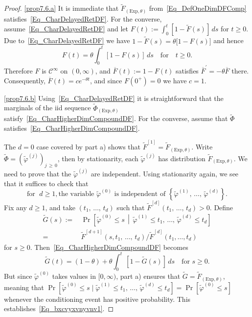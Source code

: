 \documentclass[AHL,Unicode,longabstracts]{cedram}
\newcommand{\clC}{\mathcal{C}}
\newcommand{\Expl}{\mathrm{Exp}}
\begin{document}
\pagebreak
\begin{proof}\leavevmode

\noindent\eqref{prop7.6.a} It is immediate that $\widetilde{F}_{(\Expl,\theta)}$ from~\eqref{Eq_DefOneDimDFComp} satisfies~\eqref{Eq_CharDelayedRetDF}. For the converse, assume~\eqref{Eq_CharDelayedRetDF} and let $F(t):= {\textstyle\int_{0}^{t}} [1-\widetilde{F}(s)]\,ds$ for $t\geq0$. Due to~\eqref{Eq_CharDelayedRetDF} we have $1-\widetilde{F}(s)=\theta\lbrack1-F(s)]$ and hence
\[
F(t)=\theta {\textstyle\int_{0}^{t}} [1-F(s)]\,ds\quad\text{for}\quad t\geq0.
\]
Therefore $F$ is $\clC^{\infty}$ on $(0,\infty)$, and $\overline {F}(t):=1-F(t)$ satisfies $\overline{F}^{\prime}=-\theta\overline{F}$ there. Consequently, $\overline{F}(t)=ce^{-\theta t}$, and since $F(0^{+})=0$ we have $c=1$.

\noindent\eqref{prop7.6.b}  Using~\eqref{Eq_CharDelayedRetDF} it is straightforward that the marginals of the iid sequence $\widetilde{\Phi }_{(\Expl,\theta)}$ satisfy~\eqref{Eq_CharHigherDimCompoundDF}. For the converse, assume that $\widetilde{\Phi}$ satisfies~\eqref{Eq_CharHigherDimCompoundDF}.

The $d=0$ case covered by part a) shows that $\widetilde{F}^{[1]} =\widetilde{F}_{(\Expl,\theta)}$. Write $\widetilde{\Phi} =(\widetilde{\varphi}^{(j)})_{j\,\geq\,0}$, then by stationarity, each $\widetilde{\varphi}^{(j)}$ has distribution $\widetilde{F}_{(\Expl,\theta)}$. We need to prove that the $\widetilde{\varphi}^{(j)}$ are independent. Using stationarity again, we see that it suffices to check that
\begin{equation}\label{Eq_bxcvyxvnyvnv1}
\text{for }\;d\geq1, \text{the variable }\widetilde{\varphi}^{(0)}\text{ is independent of }\left\{\widetilde{\varphi}^{(1)},\,\ldots,\,\widetilde{\varphi} ^{(d)}\right\}. 
\end{equation}
Fix any $d\geq1$, and take $(t_{1},\,\ldots,\,t_{d})$ such that $\widetilde {F}^{[d]}(t_{1},\,\ldots,\,t_{d})>0$. Define
\begin{align*}
\widetilde{G}(s)  :=& \,\Pr\left[\widetilde{\varphi}^{(0)}\leq s\,\middle|\,\widetilde {\varphi}^{(1)}\leq t_{1},\,\ldots,\,\widetilde{\varphi}^{(d)}\leq t_{d}\right]\\
 =& \,\widetilde{F}^{[d+1]}\left(s,t_{1},\,\ldots,\,t_{d}\right)/\widetilde{F}^{[d]} \left(t_{1},\ldots,t_{d}\right)
\end{align*}
for $s\geq0$. Then~\eqref{Eq_CharHigherDimCompoundDF} becomes
\[
\widetilde{G}(t)=(1-\theta)+\theta {\textstyle\int_{0}^{t}}
\,\left[1-\widetilde{G}(s)\right]\,ds\quad \text{for }s\geq0.
\]
But since $\widetilde{\varphi}^{(0)}$ takes values in $[0,\infty)$, part a) ensures that $\widetilde{G}=\widetilde{F}_{(\Expl,\theta)}$, meaning that $\Pr[\widetilde{\varphi}^{(0)}\leq s\mid\widetilde{\varphi}^{(1)}\leq t_{1},\,\ldots,\,\widetilde{\varphi}^{(d)}\leq t_{d}]=\Pr[\widetilde{\varphi }^{(0)}\leq s]$ whenever the conditioning event has positive probability. This establishes~\eqref{Eq_bxcvyxvnyvnv1}.
\end{proof}
\end{document}
